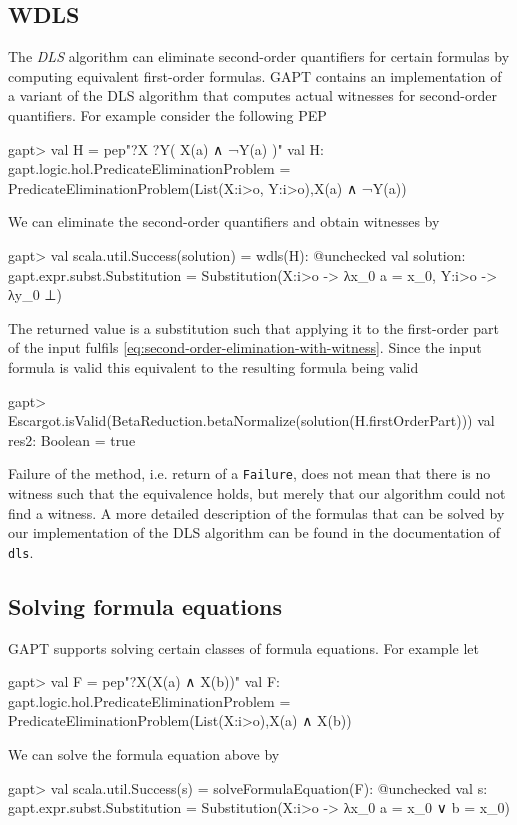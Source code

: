 \documentclass[a4paper,11pt]{book}
\begin{document}
\subsection{WDLS}

The \emph{DLS} algorithm \cite{Doherty1997Computing} can eliminate second-order quantifiers for certain formulas by computing equivalent first-order formulas.
GAPT contains an implementation of a variant of the DLS algorithm that computes actual witnesses for second-order quantifiers.
For example consider the following PEP
\begin{clilisting}
gapt> val H = pep"?X ?Y( X(a) ∧ ¬Y(a) )"
val H: gapt.logic.hol.PredicateEliminationProblem = PredicateEliminationProblem(List(X:i>o, Y:i>o),X(a) ∧ ¬Y(a))

\end{clilisting}
We can eliminate the second-order quantifiers and obtain witnesses by
\begin{clilisting}
gapt> val scala.util.Success(solution) = wdls(H): @unchecked
val solution: gapt.expr.subst.Substitution = Substitution(X:i>o -> λx_0 a = x_0, Y:i>o -> λy_0 ⊥)

\end{clilisting}
The returned value is a substitution such that applying it to the first-order part of the input fulfils \eqref{eq:second-order-elimination-with-witness}.
Since the input formula is valid this equivalent to the resulting formula being valid
\begin{clilisting}
gapt> Escargot.isValid(BetaReduction.betaNormalize(solution(H.firstOrderPart)))
val res2: Boolean = true

\end{clilisting}
Failure of the method, i.e. return of a \texttt{Failure}, does not mean that there is no witness such that the equivalence holds, but merely that our algorithm could not find a witness.
A more detailed description of the formulas that can be solved by our implementation of the DLS algorithm can be found in the documentation of \texttt{dls}.

\subsection{Solving formula equations}
GAPT supports solving certain classes of formula equations.
For example let
\begin{clilisting}
gapt> val F = pep"?X(X(a) ∧ X(b))"
val F: gapt.logic.hol.PredicateEliminationProblem = PredicateEliminationProblem(List(X:i>o),X(a) ∧ X(b))

\end{clilisting}
We can solve the formula equation above by
\begin{clilisting}
gapt> val scala.util.Success(s) = solveFormulaEquation(F): @unchecked
val s: gapt.expr.subst.Substitution = Substitution(X:i>o -> λx_0 a = x_0 ∨ b = x_0)

\end{clilisting}
\end{document}

